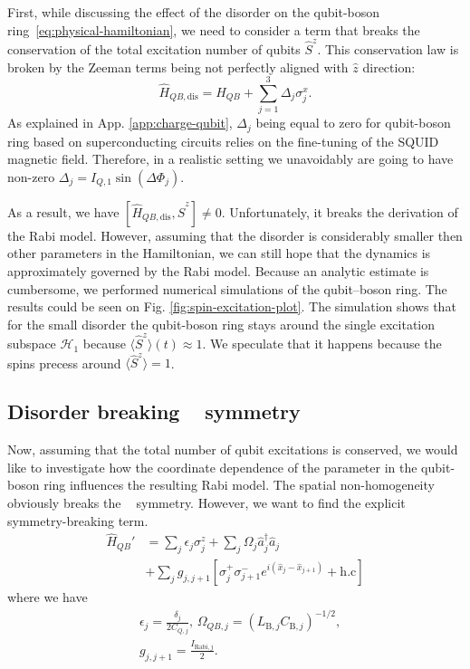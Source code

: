\documentclass[reprint, aps, prx, amsmath, amssymb, longbibliography, superscriptaddress]{revtex4-2}
\DeclareMathOperator{\Zthree}{\mathbb{Z}_3}
\begin{document}
First, while discussing the effect of the disorder on the qubit-boson ring~\eqref{eq:physical-hamiltonian}, we need to consider a term that breaks the conservation of the total excitation number of qubits $\hat S^z$. This conservation law is broken by the Zeeman terms being not perfectly aligned with $\hat z$ direction:
\begin{equation}
    \hat H_{QB,\text{dis}} = \hat H_{QB} + \sum_{j=1}^3 \Delta_j \sigma_j^x.
\end{equation}
As explained in App. \ref{app:charge-qubit}, $\Delta_j$ being equal to zero for qubit-boson ring based on superconducting circuits relies on the fine-tuning of the SQUID magnetic field. Therefore, in a realistic setting we unavoidably are going to have non-zero $\Delta_j = I_{Q,1}\sin(\Delta \Phi_j)$.



As a result, we have $[\hat H_{QB,\text{dis}}, \hat S^z] \neq 0 $. Unfortunately, it breaks the derivation of the Rabi model. However, assuming that the disorder is considerably smaller then other parameters in the Hamiltonian, we can still hope that the dynamics is approximately governed by the Rabi model. Because an analytic estimate is cumbersome, we performed numerical simulations of the qubit–boson ring. The results could be seen on Fig. \ref{fig:spin-excitation-plot}. The simulation shows that for the small disorder the qubit-boson ring stays around the single excitation subspace $\mathcal{H}_1$ because $\langle \hat S^z \rangle(t) \approx 1$. We speculate that it happens because the spins precess around $\langle \hat S^z \rangle = 1$.


\subsection{Disorder breaking \texorpdfstring{$\Zthree$}{Z3} symmetry}


Now, assuming that the total number of qubit excitations is conserved, we would like to investigate how the coordinate dependence of the parameter in the qubit-boson ring influences the resulting Rabi model. The spatial non-homogeneity obviously breaks the $\Zthree$ symmetry. However, we want to find the explicit symmetry-breaking term.
\begin{equation}
\label{eq:rabi-breaking-disorder}
\begin{aligned}
  \hat H_{QB}' &= \sum_j \epsilon_{j} \sigma_j^z + \sum_j \Omega_j \hat a^{\dagger}_j \hat a_j  \\
  &+ \sum_j g_{j,j+1} \left[\sigma_j^+ \sigma_{j+1}^- e^{i (\hat x_j - \hat x_{j+1})} +\text{h.c}\right]
\end{aligned}
\end{equation}
where we have
\begin{equation}
\begin{aligned}
    &\epsilon_j = \frac{\delta_j}{2 C_{Q,j}},\,
    \Omega_{QB,j} = \left(L_{\text{B},j}C_{\text{B},j}\right)^{-1/2}, \\
    &g_{j,j+1} = \frac{I_{\text{Rabi},j}}{2}.
\end{aligned}
\end{equation}
\end{document}
